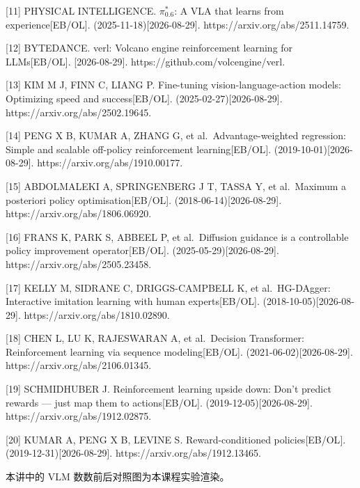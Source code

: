 \documentclass[
  chinese,
]{ctexart}
\begin{document}
{[}11{]} PHYSICAL INTELLIGENCE. \(\pi^{*}_{0.6}\): A VLA that learns
from experience{[}EB/OL{]}. (2025-11-18){[}2026-08-29{]}.
https://arxiv.org/abs/2511.14759.

{[}12{]} BYTEDANCE. verl: Volcano engine reinforcement learning for
LLMs{[}EB/OL{]}. {[}2026-08-29{]}. https://github.com/volcengine/verl.

{[}13{]} KIM M J, FINN C, LIANG P. Fine-tuning vision-language-action
models: Optimizing speed and success{[}EB/OL{]}.
(2025-02-27){[}2026-08-29{]}. https://arxiv.org/abs/2502.19645.

{[}14{]} PENG X B, KUMAR A, ZHANG G, et al.~Advantage-weighted
regression: Simple and scalable off-policy reinforcement
learning{[}EB/OL{]}. (2019-10-01){[}2026-08-29{]}.
https://arxiv.org/abs/1910.00177.

{[}15{]} ABDOLMALEKI A, SPRINGENBERG J T, TASSA Y, et al.~Maximum a
posteriori policy optimisation{[}EB/OL{]}. (2018-06-14){[}2026-08-29{]}.
https://arxiv.org/abs/1806.06920.

{[}16{]} FRANS K, PARK S, ABBEEL P, et al.~Diffusion guidance is a
controllable policy improvement operator{[}EB/OL{]}.
(2025-05-29){[}2026-08-29{]}. https://arxiv.org/abs/2505.23458.

{[}17{]} KELLY M, SIDRANE C, DRIGGS-CAMPBELL K, et al.~HG-DAgger:
Interactive imitation learning with human experts{[}EB/OL{]}.
(2018-10-05){[}2026-08-29{]}. https://arxiv.org/abs/1810.02890.

{[}18{]} CHEN L, LU K, RAJESWARAN A, et al.~Decision Transformer:
Reinforcement learning via sequence modeling{[}EB/OL{]}.
(2021-06-02){[}2026-08-29{]}. https://arxiv.org/abs/2106.01345.

{[}19{]} SCHMIDHUBER J. Reinforcement learning upside down: Don't
predict rewards --- just map them to actions{[}EB/OL{]}.
(2019-12-05){[}2026-08-29{]}. https://arxiv.org/abs/1912.02875.

{[}20{]} KUMAR A, PENG X B, LEVINE S. Reward-conditioned
policies{[}EB/OL{]}. (2019-12-31){[}2026-08-29{]}.
https://arxiv.org/abs/1912.13465.

本讲中的 VLM 数数前后对照图为本课程实验渲染。
\end{document}
